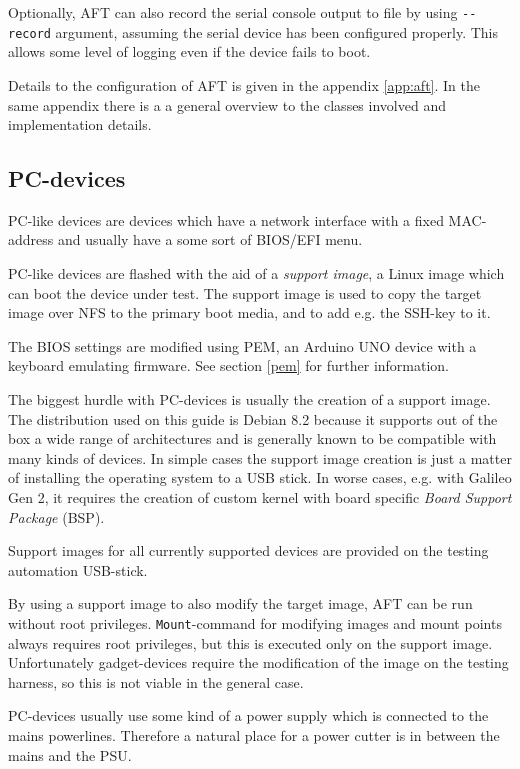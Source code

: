 \documentclass[a4paper,11pt]{article}
\newcommand{\cmd}[1]{\texttt{#1}}
\begin{document}
Optionally, AFT can also record the serial console output to file by using \cmd{-\/-record} argument, assuming the serial device has been configured properly. This allows some level of logging even if the device fails to boot.

Details to the configuration of AFT is given in the appendix \ref{app:aft}. In the same appendix there is a a general overview to the classes involved and implementation details.

\subsection{PC-devices}
\label{pc}
PC-like devices are devices which have a network interface with a fixed MAC-address and usually have a some sort of BIOS/EFI menu.

PC-like devices are flashed with the aid of a \textit{support image}, a Linux image which can boot the device under test. The support image is used to copy the target image over NFS to the primary boot media, and to add e.g. the SSH-key to it.

The BIOS settings are modified using PEM, an Arduino UNO device with a keyboard emulating firmware. See section \ref{pem} for further information.

The biggest hurdle with PC-devices is usually the creation of a support image. The distribution used on this guide is Debian 8.2 because it supports out of the box a wide range of architectures and is generally known to be compatible with many kinds of devices. In simple cases the support image creation is just a matter of installing the operating system to a USB stick. In worse cases, e.g. with Galileo Gen 2, it requires the creation of custom kernel with board specific \textit{Board Support Package} (BSP).

Support images for all currently supported devices are provided on the testing automation USB-stick.

By using a support image to also modify the target image, AFT can be run without root privileges. \cmd{Mount}-command for modifying images and mount points always requires root privileges, but this is executed only on the support image. Unfortunately gadget-devices require the modification of the image on the testing harness, so this is not viable in the general case.

PC-devices usually use some kind of a power supply which is connected to the mains powerlines. Therefore a natural place for a power cutter is in between the mains and the PSU.
\end{document}
